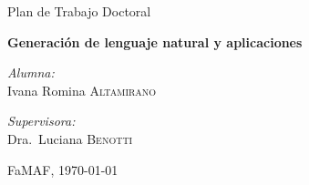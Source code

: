 \documentclass[a4paper,12pt]{article}
\begin{document}
\renewcommand{\refname}{Bibliograf\'ia}
\begin{titlepage}

\begin{center}




\vspace{5cm}
{\Large Plan de Trabajo Doctoral}\\[0.5cm]

\vspace{2cm}

{ \Large \bfseries Generaci\'on de lenguaje natural y aplicaciones} \\ 

\vspace{0.5cm}



\begin{minipage}{0.4\textwidth}
\begin{flushleft} \large
\emph{Alumna:}\\
Ivana Romina \textsc{Altamirano}
\end{flushleft}
\end{minipage}
\begin{minipage}{0.4\textwidth}
\begin{flushright} \large
\emph{Supervisora:} \\
Dra.~Luciana \textsc{Benotti}
\end{flushright}
\end{minipage}

\vfill

{\large FaMAF, \today}

\end{center}

\end{titlepage}

\date{}
\tableofcontents{}
\newpage



%






\end{document}

